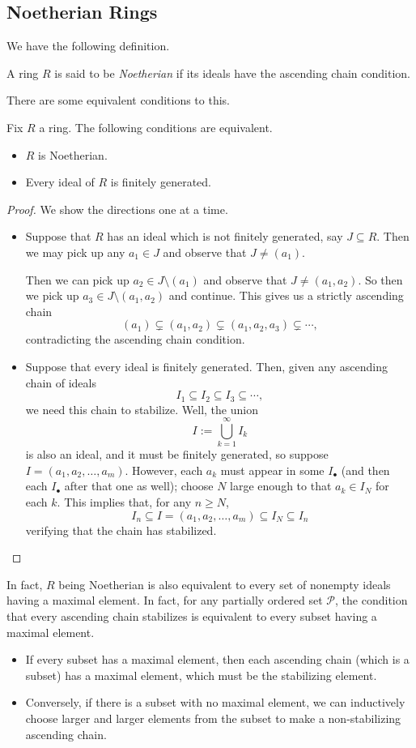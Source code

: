 \subsection{Noetherian Rings}
We have the following definition.
\begin{definition}
	A ring $R$ is said to be \textit{Noetherian} if its ideals have the ascending chain condition.
\end{definition}
There are some equivalent conditions to this.
\begin{proposition} \label{prop:noethergrapbag}
	Fix $R$ a ring. The following conditions are equivalent.
	\begin{itemize}
		\item $R$ is Noetherian.
		\item Every ideal of $R$ is finitely generated.
	\end{itemize}
\end{proposition}
\begin{proof}
	We show the directions one at a time.
	\begin{itemize}
		\item Suppose that $R$ has an ideal which is not finitely generated, say $J\subseteq R$. Then we may pick up any $a_1\in J$ and observe that $J\ne(a_1)$.

		Then we can pick up $a_2\in J\setminus(a_1)$ and observe that $J\ne(a_1,a_2)$. So then we pick up $a_3\in J\setminus(a_1,a_2)$ and continue. This gives us a strictly ascending chain
		\[(a_1)\subsetneq(a_1,a_2)\subsetneq(a_1,a_2,a_3)\subsetneq\cdots,\]
		contradicting the ascending chain condition.
		\item Suppose that every ideal is finitely generated. Then, given any ascending chain of ideals
		\[I_1\subseteq I_2\subseteq I_3\subseteq\cdots,\]
		we need this chain to stabilize. Well, the union
		\[I:=\bigcup_{k=1}^\infty I_k\]
		is also an ideal, and it must be finitely generated, so suppose $I=(a_1,a_2,\ldots,a_m)$. However, each $a_k$ must appear in some $I_\bullet$ (and then each $I_\bullet$ after that one as well); choose $N$ large enough to that $a_k\in I_N$ for each $k$. This implies that, for any $n\ge N$,
		\[I_n\subseteq I=(a_1,a_2,\ldots,a_m)\subseteq I_N\subseteq I_n\]
		verifying that the chain has stabilized.
		\qedhere
	\end{itemize}
\end{proof}
\begin{remark}[Nir]
	In fact, $R$ being Noetherian is also equivalent to every set of nonempty ideals having a maximal element. In fact, for any partially ordered set $\mathcal P$, the condition that every ascending chain stabilizes is equivalent to every subset having a maximal element.
	\begin{itemize}
		\item If every subset has a maximal element, then each ascending chain (which is a subset) has a maximal element, which must be the stabilizing element.
		\item Conversely, if there is a subset with no maximal element, we can inductively choose larger and larger elements from the subset to make a non-stabilizing  ascending chain.
	\end{itemize}
\end{remark}
